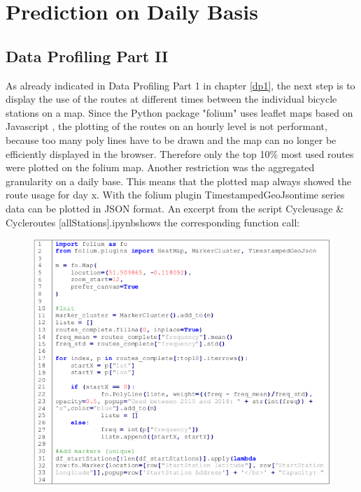 \section{Prediction on Daily Basis}\label{sec:daily}
\subsection{Data Profiling Part II}\label{dp2}
As already indicated in Data Profiling Part 1 in chapter \ref{dp1}, the next step is to display the use of the routes at
different times between the individual bicycle stations on a map. Since the Python package
"folium" uses leaflet maps based on Javascript \cite{RN5}, the plotting of the routes on an hourly level is
not performant, because too many poly lines have to be drawn and the map can no longer be
efficiently displayed in the browser. Therefore only the top 10\% most used routes were plotted on
the folium map. Another restriction was the aggregated granularity on a daily base. This means
that the plotted map always showed the route usage for day x. With the folium plugin
\glqq TimestampedGeoJson\grqq time series data can be plotted in JSON format. An excerpt from the
script \glqq Cycleusage \& Cycleroutes [allStations].ipynb\grqq shows the corresponding function call:
\begin{figure}[H]
\hspace{-1.6cm}
\includegraphics[width=1.2\textwidth]{img/listing1}\label{fig:listing1}
\end{figure}
